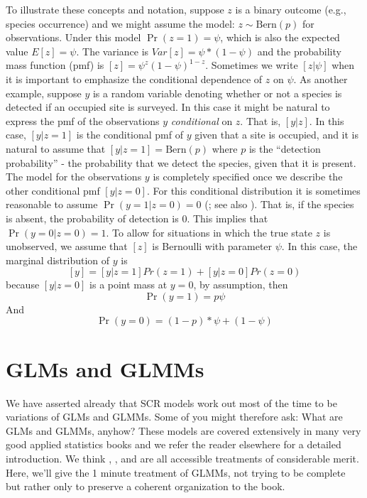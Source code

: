 To illustrate these concepts and notation, suppose $z$ is a binary
outcome (e.g., species occurrence) and we might assume the model: $z
\sim \mbox{Bern}(p)$ for observations.  Under this model $\Pr(z=1) =
\psi$, which is also the expected value $E[z] = \psi$. The variance is
$Var[z] = \psi*(1-\psi)$ and the probability mass function (pmf) is $[z]
= \psi^{z} (1-\psi)^{1-z}$. Sometimes we write $[z|\psi]$ when it is
important to emphasize the conditional dependence of $z$ on $\psi$. As
another example, suppose $y$ is a random variable denoting whether or
not a species is detected if an occupied site is surveyed. In this
case it might be natural to express the pmf of the observations $y$
{\it conditional} on $z$. That is, $[y|z]$. In this case, $[y|z=1]$ is
the conditional pmf of $y$ given that a site is occupied, and it is
natural to assume that $[y|z=1] = \mbox{Bern}(p)$ where $p$ is the
``detection probability'' - the probability that we detect the
species, given that it is present. The model for the observations $y$
is completely specified once we describe the other conditional pmf
$[y|z=0]$. For this conditional distribution it is sometimes
reasonable to assume $\Pr(y=1|z=0) = 0$ (\citet{mackenzie_etal:2002};
see also \citet{royle_link:2006}). That is, if the species is absent,
the probability of detection is 0. This implies that
$\Pr(y=0|z=0)=1$. To allow for situations in which the true state $z$
is unobserved, we  assume that $[z]$ is Bernoulli with parameter
$\psi$.  In this case, the marginal distribution of $y$ is
\[
 [y] = [y|z=1]Pr(z=1) + [y|z=0]Pr(z=0)
\]
because $[y|z=0]$ is a point mass at $y=0$, by assumption, then 
\[
\Pr(y=1) = p \psi
\]
And
\[
\Pr(y=0) = (1-p)*\psi + (1-\psi)
\]


\section{
GLMs and GLMMs}
We have asserted already that SCR models work out most of the time to
be variations of GLMs and GLMMs. Some of you might therefore ask: What
are GLMs and GLMMs, anyhow?   These models are covered extensively in
many very good applied statistics books and we refer the reader
elsewhere for a detailed introduction. We think \citet{kery:2010},
\citet{kery_schaub:2011}, and \citet{zuur_etal:2009} are all
accessible treatments of considerable merit. Here, we'll give the 1
minute 
treatment of GLMMs, not trying to be complete but rather only 
to preserve a coherent organization to the book.


